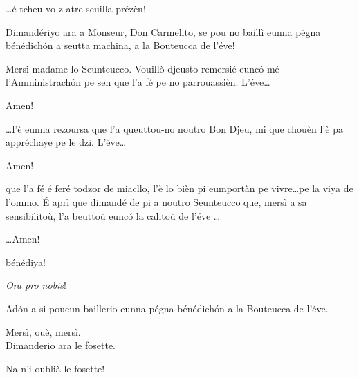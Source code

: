 \begin{drama}
\Seunteuccospeaks \ldots é tcheu vo-z-atre seuilla prézèn!


\Seunteuccospeaks Dimandériyo ara a Monseur, Don Carmelito, se pou no baillì eunna pégna bénédich\'on a seutta machina, a la Bouteucca  de l'éve!


\Donspeaks Mersì madame lo Seunteucco. Vouillò djeusto remersié eunc\'o mé l'Amministrach\'on pe sen que l'a fé pe no parrouassièn. L'éve\ldots

\Dzispeaks Amen!

\Donspeaks \ldots l'è eunna rezoursa que l'a queuttou-no noutro Bon Djeu, mi que chouèn l'è pa appréchaye pe le dzi. L'éve\ldots

\Dzispeaks Amen!

\Donspeaks que l'a fé é feré todzor de miacllo, l'è lo bièn pi eumportàn pe vivre\ldots pe la viya de l’ommo. \'E aprì que dimandé de pi a noutro Seunteucco que, mersì a sa sensibilitoù, l’a beuttoù eunc\'o la calitoù de l’éve \ldots

\Dzispeaks \ldots Amen!

\Donspeaks bénédiya!

\Dzispeaks \textit{Ora pro nobis}!


\Donspeaks Ad\'on a si poueun baillerio eunna pégna bénédich\'on a la Bouteucca de l'éve.


\Seunteuccospeaks{} Mersì, ouè, mersì.\\  Dimanderio ara le fosette\forbici .

\Valletspeaks{} Na n'i oublià le fosette!



\end{drama}

